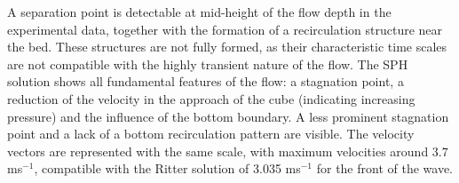 A separation point is detectable at mid-height of the flow depth in the experimental data, together with the formation of a recirculation structure near the bed. These structures are not fully formed, as their characteristic time scales are not compatible with the highly transient nature of the flow. The \ac{SPH} solution shows all  fundamental features of the flow: a stagnation point, a reduction of the velocity in the approach of the cube (indicating increasing pressure) and the influence of the bottom boundary. A less prominent stagnation point and a lack of a bottom recirculation pattern are visible. The velocity vectors are represented with the same scale, with maximum velocities around $3.7$ ms$^{-1}$, compatible with the Ritter solution \citep{stoker-1957} of 3.035 ms$^{-1}$ for the front of the wave.





